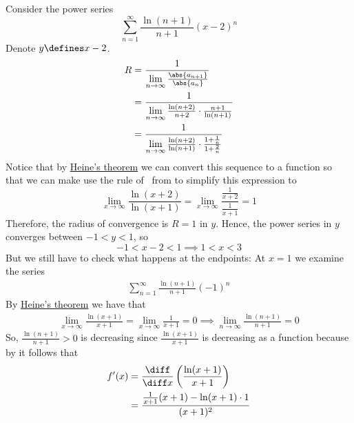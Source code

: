 \begin{exm}\label{exm-power-series:3}
	Consider the power series
	\begin{equation*}
		\sum_{n=1}^\infty \frac{\ln(n+1)}{n+1}(x-2)^n
	\end{equation*}
	Denote $y \defines x-2$.
	\begin{align*}
		R & = \frac{1}{\lim\limits_{n\to\infty}\frac{\abs{a_{n+1}}}{\abs{a_n}}}                                   \\
		  & = \frac{1}{\lim\limits_{n\to\infty}\frac{\ln(n+2)}{n+2}\cdot\frac{n+1}{\ln(n+1)}}                     \\
		  & = \frac{1}{\lim\limits_{n\to\infty}\frac{\ln(n+2)}{\ln(n+1)}\cdot\frac{1+\frac{1}{n}}{1+\frac{2}{n}}}
	\end{align*}
	Notice that by \hyperref[thm-heines-theorem]{Heine's theorem} we can convert this
	sequence to a function so that we can make use the rule of \lhoptial\, from
	 to simplify this expression to
	\begin{equation*}
		\lim_{x\to\infty}\frac{\ln(x+2)}{\ln(x+1)} = \lim_{x\to\infty}\frac{\frac{1}{x+2}}{\frac{1}{x+1}} = 1
	\end{equation*}
	Therefore, the radius of convergence is $R=1$ in $y$. Hence, the power series
	in $y$ converges between $-1<y<1$, so
	\begin{equation*}
		-1 < x-2 < 1 \implies 1 < x < 3
	\end{equation*}
	But we still have to check what happens at the endpoints: At $x=1$ we examine the series
	\begin{align*}
		\sum_{n=1}^\infty \frac{\ln(n+1)}{n+1}(-1)^n
	\end{align*}
	By \hyperref[thm-heines-theorem]{Heine's theorem} we have that
	\begin{align*}
		\lim_{x\to\infty}\frac{\ln(x+1)}{x+1} = \lim_{x\to\infty}\frac{1}{x+1} = 0 \implies \lim_{n\to\infty}\frac{\ln(n+1)}{n+1} = 0
	\end{align*}
	So, $\tfrac{\ln(n+1)}{n+1}>0$ is decreasing since $\tfrac{\ln(x+1)}{x+1}$ is
	decreasing as a function because by 
	it follows that
	\begin{align*}
		f'(x) & = \frac{\diff}{\diff x}\left(\frac{\ln(x+1)}{x+1}\right)                                 \\
		      & = \frac{\frac{1}{x+1}(x+1)-\ln(x+1)\cdot1}{(x+1)^2}                                      \\

\end{align*}
\end{exm}
